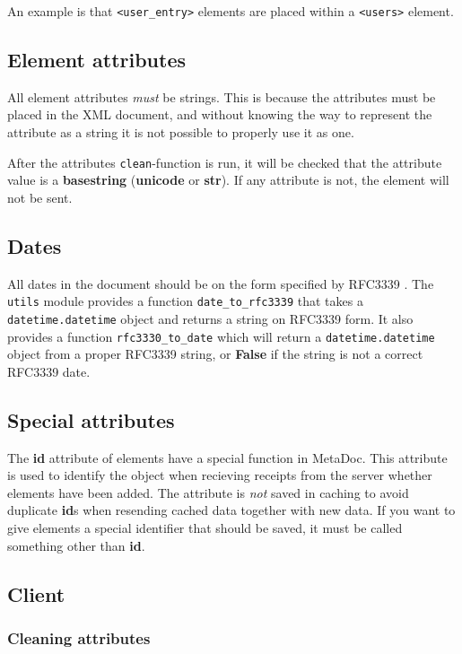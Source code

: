 \documentclass[titlepage, a4paper,10pt]{article}
\begin{document}
An example is that \texttt{<user\_entry>} elements are placed within a
\texttt{<users>} element. 

\subsection{Element attributes}

All element attributes \textit{must} be strings. This is because the attributes 
must be placed in the XML document, and without knowing the way to represent the 
attribute as a string it is not possible to properly use it as one.

After the attributes \texttt{clean}-function is run, it will be checked that
the attribute value is a \textbf{basestring} (\textbf{unicode} or
\textbf{str}). If any attribute is not, the element will not be sent. 

\subsection{Dates}

All dates in the document should be on the form specified by RFC3339 
\cite{rfc3339}. The \texttt{utils} module provides a function 
\texttt{date\_to\_rfc3339} that takes a \texttt{datetime.datetime} object and 
returns a string on RFC3339 form. It also provides a function
\texttt{rfc3330\_to\_date} which will return a \texttt{datetime.datetime}
object from a proper RFC3339 string, or \textbf{False} if the string is not a
correct RFC3339 date.

\subsection{Special attributes}

The \textbf{id} attribute of elements have a special function in MetaDoc. This 
attribute is used to identify the object when recieving receipts from the server 
whether elements have been added. The attribute is \textit{not} saved in caching 
to avoid duplicate \textbf{id}s when resending cached data together with new 
data. If you want to give elements a special identifier that should be saved, it 
must be called something other than \textbf{id}.

\subsection{Client}

\subsubsection{Cleaning attributes}
\end{document}
